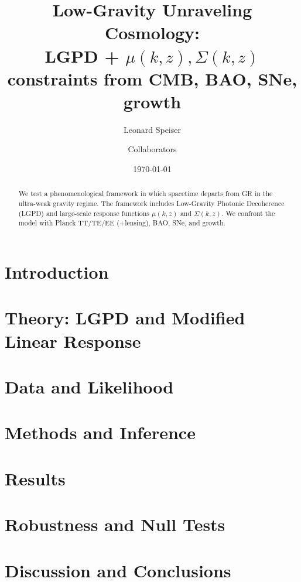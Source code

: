 \documentclass[11pt]{article}
\title{Low-Gravity Unraveling Cosmology: \\ LGPD + $\mu(k,z), \Sigma(k,z)$ constraints from CMB, BAO, SNe, growth}
\author[1]{Leonard Speiser}
\author[2]{Collaborators}
\affil[1]{Your Affiliation}
\affil[2]{Additional Affiliations}
\date{\today}
\begin{document}
\maketitle

\begin{abstract}
We test a phenomenological framework in which spacetime departs from GR in the ultra-weak gravity regime. 
The framework includes Low-Gravity Photonic Decoherence (LGPD) and large-scale response functions $\mu(k,z)$ and $\Sigma(k,z)$.
We confront the model with Planck TT/TE/EE (+lensing), BAO, SNe, and growth.
\end{abstract}

\section{Introduction}


\section{Theory: LGPD and Modified Linear Response}


\section{Data and Likelihood}


\section{Methods and Inference}


\section{Results}


\section{Robustness and Null Tests}


\section{Discussion and Conclusions}




\end{document}
